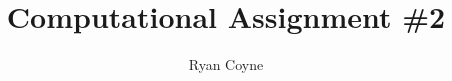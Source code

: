 \documentclass[12pt]{article}
\begin{document}
    \title{Computational Assignment \#2}
    \author{Ryan Coyne}
    \maketitle

    
\end{document}
